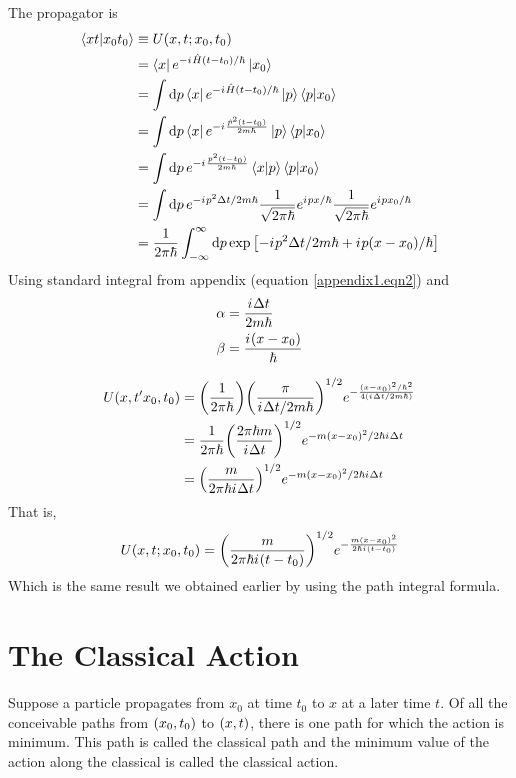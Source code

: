	
	The propagator is 
	\begin{align}
		\braket{x t}{x_0 t_0} &\equiv U\qty(x, t; x_0, t_0) \\
		&= \bra{x} e^{-{i\mkern1mu} \hat{H}(t-t_0)/\hbar}\ket{x_0} \\
		&= \int \dd{p} \bra{x} e^{-{i\mkern1mu} \hat{H}(t-t_0)/\hbar}\ket{p}\braket{p}{x_0} \\
		&= \int \dd{p} \bra{x} e^{-{i\mkern1mu} \frac{\hat{p}^2\qty(t-t_0)}{2 m \hbar}}\ket{p}\braket{p}{x_0} \\
		&= \int \dd{p} e^{-{i\mkern1mu} \frac{p^2\qty(t-t_0)}{2 m \hbar}}\braket{x}{p}\braket{p}{x_0} \\
		&= \int \dd{p} e^{-{i\mkern1mu} p^2 \Delta t /2 m \hbar} \frac{1}{\sqrt{2\pi\hbar}} e^{{i\mkern1mu} p x/\hbar} \frac{1}{\sqrt{2\pi\hbar}} e^{{i\mkern1mu} p x_0/\hbar} \\
		&= \frac{1}{2\pi\hbar} \int_{-\infty}^{\infty} \dd{p} \exp\qty[-{i\mkern1mu} p^2 \Delta t/2 m \hbar + {i\mkern1mu} p \qty(x-x_0)/\hbar]
	\end{align}
	Using standard integral from appendix (equation \ref{appendix1.eqn2}) and 
	\begin{align}
		\alpha &= \frac{{i\mkern1mu} \Delta t}{2 m \hbar} \\
		\beta &= \frac{{i\mkern1mu} \qty(x-x_0)}{\hbar}
	\end{align}
	
	\begin{align*}
		U\qty(x,t'x_0,t_0) 
		&= \qty(\frac{1}{2\pi \hbar}) \qty(\frac{\pi}{{i\mkern1mu} \Delta t / 2 m \hbar})^{1/2} e^{-\frac{\qty(x-x_0)^2/\hbar^2}{4\qty({i\mkern1mu} \Delta t /2 m \hbar)}} \\
		&= \frac{1}{2\pi \hbar} \qty(\frac{2\pi \hbar m}{{i\mkern1mu} \Delta t})^{1/2} e^{-m\qty(x-x_0)^2/2 \hbar {i\mkern1mu} \Delta t} \\
		&= \qty(\frac{m}{2\pi \hbar {i\mkern1mu} \Delta t})^{1/2} e^{-m\qty(x-x_0)^2/2 \hbar {i\mkern1mu} \Delta t} 
	\end{align*}
	That is,
	\begin{equation}
		U\qty(x,t;x_0,t_0) = \qty(\frac{m}{2\pi\hbar {i\mkern1mu} \qty(t-t_0)})^{1/2} e^{-\frac{m\qty(x-x_0)^2}{2\hbar {i\mkern1mu} \qty(t-t_0)}}
	\end{equation}
	Which is the same result we obtained earlier by using the path integral formula.
	
	
	\section{The Classical Action}
		Suppose a particle propagates from $x_0$ at time $t_0$ to $x$ at a later time $t$. Of all the conceivable paths from $\qty(x_0, t_0)$ to $\qty(x,t)$, there is one path for which the action is minimum. This path is called the classical path and the minimum value of the action along the classical is called the classical action.
		
